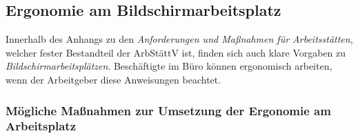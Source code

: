 \documentclass[a4paper, 12pt]{report}
\begin{document}
\begin{multicols}{2}
\subsection{Ergonomie am Bildschirmarbeitsplatz}

Innerhalb des Anhangs zu den \emph{Anforderungen und Maßnahmen für
Arbeitsstätten}, welcher fester Bestandteil der ArbStättV ist, finden sich auch
klare Vorgaben zu \emph{Bildschirmarbeitsplätzen}. Beschäftigte im Büro können
ergonomisch arbeiten, wenn der Arbeitgeber diese Anweisungen beachtet.

\subsubsection{Mögliche Maßnahmen zur Umsetzung der Ergonomie am Arbeitsplatz}


\end{multicols}
\end{document}
